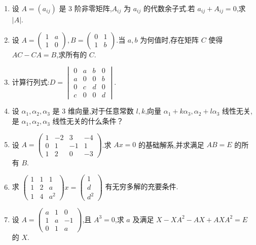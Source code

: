 \begin{enumerate}
	\item 设 $A=(a_{ij})$ 是 3 阶非零矩阵,$A_{ij}$ 为 $a_{ij}$ 的代数余子式.若 $a_{ij} + A_{ij} = 0$,求 $|A|$.
	
	\item 设 $A = \begin{pmatrix} 1 & a \\ 1 & 0 \end{pmatrix}, B = \begin{pmatrix} 0 & 1 \\ 1 & b \end{pmatrix}$.当 $a, b$ 为何值时,存在矩阵 $C$ 使得 $AC - CA = B$,求所有的 $C$.
	
	\item 计算行列式:$D = \begin{vmatrix} 0 & a & b & 0 \\ a & 0 & 0 & b \\ 0 & c & d & 0 \\ c & 0 & 0 & d \end{vmatrix}$.
	
	\item 设 $\alpha_1, \alpha_2, \alpha_3$ 是 3 维向量,对于任意常数 $l, k$,向量 $\alpha_1 + k\alpha_3, \alpha_2 + l\alpha_3$ 线性无关,是 $\alpha_1, \alpha_2, \alpha_3$ 线性无关的什么条件？
	
	\item 设 $A = \begin{pmatrix} 1 & -2 & 3 & -4 \\ 0 & 1 & -1 & 1 \\ 1 & 2 & 0 & -3 \end{pmatrix}$.求 $Ax=0$ 的基础解系,并求满足 $AB=E$ 的所有 $B$.
	
	\item 求 $\begin{pmatrix} 1 & 1 & 1 \\ 1 & 2 & a \\ 1 & 4 & a^2 \end{pmatrix}x = \begin{pmatrix} 1 \\ d \\ d^2 \end{pmatrix}$ 有无穷多解的充要条件.
	
	\item 设 $A = \begin{pmatrix} a & 1 & 0 \\ 1 & a & -1 \\ 0 & 1 & a \end{pmatrix}$,且 $A^3 = 0$,求 $a$ 及满足 $X - XA^2 - AX + AXA^2 = E$ 的 $X$.
	

\end{enumerate}
